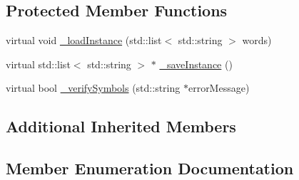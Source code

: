 \subsection*{Protected Member Functions}
\begin{DoxyCompactItemize}
\item 
virtual void \hyperlink{class_resource_a5c4aedea65e6800cf44fb3620d559148}{\+\_\+load\+Instance} (std\+::list$<$ std\+::string $>$ words)
\item 
virtual std\+::list$<$ std\+::string $>$ $\ast$ \hyperlink{class_resource_a546f61a6f5f57f0c41c722b9b9dc7478}{\+\_\+save\+Instance} ()
\item 
virtual bool \hyperlink{class_resource_a3b282a34c4c706ca63716cb74e7f8183}{\+\_\+verify\+Symbols} (std\+::string $\ast$error\+Message)
\end{DoxyCompactItemize}
\subsection*{Additional Inherited Members}


\subsection{Member Enumeration Documentation}
